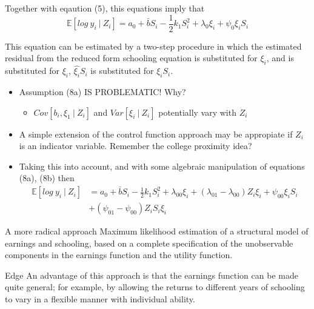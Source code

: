 \documentclass{beamer}
\begin{document}
\begin{frame}{}
  Together with eqaution (5), this equations imply that
  \begin{equation*}
      \mathbb{E}[log~y_{i}~|~Z_{i}]=a_{0}+\bar{b}S_{i}-\frac{1}{2}k_{1}S_{i}^{2} + \lambda_{0}\xi_{i} + \psi_{0}\xi_{i}S_{i}
  \end{equation*}
 
 This equation can be estimated by a two-step procedure in which the estimated residual  from the reduced form schooling equation is substituted for $\xi_{i}$, and is substituted for $\xi_{i}$, $\hat{\xi_{i}}S_{i}$ is substituted for $\xi_{i}S_{i}$.
 
 \begin{itemize}
     \item Assumption (8a) IS PROBLEMATIC! Why?
     \begin{itemize}
         \item $Cov[b_{i},\xi_{1}~|~Z_{i}]$ and $Var[\xi_{i}~|~Z_{i}]$ potentially vary with $Z_{i}$
     \end{itemize}
     \item A simple extension of the control function approach may be appropiate if $Z_{i}$ is an indicator variable. Remember the college proximity idea?
     \item Taking this into account, and with some algebraic manipulation of equations (8a), (8b) then 
     \begin{align*}
      \mathbb{E}[log~y_{i}~|~Z_{i}] & =a_{0}+\bar{b}S_{i}-\frac{1}{2}k_{1}S_{i}^{2} + \lambda_{00}\xi_{i} + (\lambda_{01}-\lambda_{00})Z_{i}\xi_{i} + \psi_{00}\xi_{i}S_{i} \\      & + (\psi_{01}-\psi_{00})Z_{i}S_{i}\xi_{i}
  \end{align*}
 \end{itemize}
\end{frame}

\begin{frame}{A more radical approach}
Maximum likelihood estimation of a structural model of earnings and schooling, based on a complete specification of the unobservable components in the earnings function and the utility function.

\begin{block}{Edge}
An advantage of this approach is that the earnings function can be made quite general; for example, by allowing the returns to different years of schooling to vary in a flexible manner with individual ability. 
\end{block}
    
\end{frame}
\end{document}

